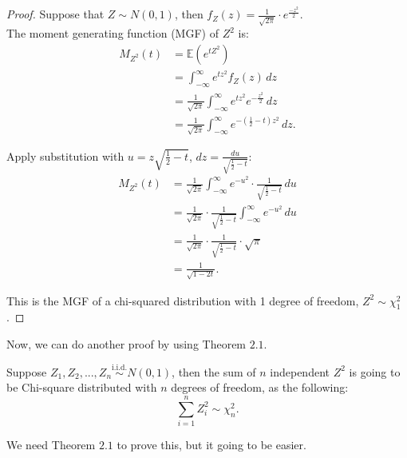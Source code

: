 \begin{proof}
Suppose that \( Z \sim N(0, 1) \), then \( f_{Z}(z) = \frac{1}{\sqrt{2\pi}} \cdot e^{\frac{-z^2}{2}} \).\\
The moment generating function (MGF) of $Z^2$ is:
\begin{align*}
M_{Z^2}(t) &= \mathbb{E}\left(e^{tZ^2}\right) \\
&= \int_{-\infty}^{\infty} e^{tz^2} f_Z(z) \, dz \\
&= \frac{1}{\sqrt{2\pi}} \int_{-\infty}^{\infty} e^{tz^2} e^{-\frac{z^2}{2}} \, dz \\
&= \frac{1}{\sqrt{2\pi}} \int_{-\infty}^{\infty} e^{-\left(\frac{1}{2}-t\right)z^2} \, dz.
\end{align*}

Apply substitution with $u = z\sqrt{\frac{1}{2}-t}$, $dz = \frac{du}{\sqrt{\frac{1}{2}-t}}$:
\begin{align*}
M_{Z^2}(t) &= \frac{1}{\sqrt{2\pi}} \int_{-\infty}^{\infty} e^{-u^2} \cdot \frac{1}{\sqrt{\frac{1}{2}-t}} \, du \\
&= \frac{1}{\sqrt{2\pi}} \cdot \frac{1}{\sqrt{\frac{1}{2}-t}} \int_{-\infty}^{\infty} e^{-u^2} \, du \\
&= \frac{1}{\sqrt{2\pi}} \cdot \frac{1}{\sqrt{\frac{1}{2}-t}} \cdot \sqrt{\pi} \\
&= \frac{1}{\sqrt{1-2t}}.
\end{align*}

This is the MGF of a chi-squared distribution with 1 degree of freedom, $Z^2 \sim \chi_1^2$.
\end{proof}

\noindent
Now, we can do another proof by using Theorem $2.1$.

\begin{thm}[$ \sum_{i = 1}^{n}Z_{i}^{2} \sim \chi_{n}^{2}$]
Suppose $Z_1, Z_2, ..., Z_n \overset{\text{i.i.d.}}{\sim} N(0,1)$, then the sum of $n$ independent $Z^2$ is going to be Chi-square distributed with $n$ degrees of freedom, as the following: \[ \sum_{i=1}^{n}Z_{i}^{2} \sim \chi_{n}^{2}.\]
\end{thm}

\noindent
We need Theorem $2.1$ to prove this, but it going to be easier. 

